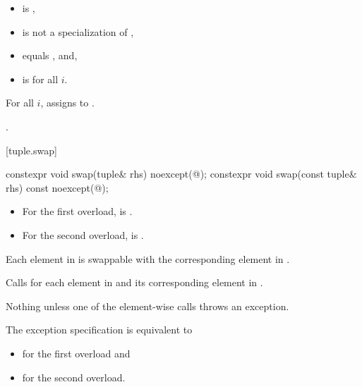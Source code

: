\begin{itemdescr}
\pnum
\constraints
\begin{itemize}
\item
{}
is ,

\item
{}
is not a specialization of ,

\item
{}
equals , and,

\item
{}
is  for all $i$.
\end{itemize}

\pnum
\effects
For all $i$, assigns
 to .

\pnum
\returns
{}.
\end{itemdescr}

[tuple.swap]{}

%
\begin{itemdecl}
constexpr void swap(tuple& rhs) noexcept(@\seebelow@);
constexpr void swap(const tuple& rhs) const noexcept(@\seebelow@);
\end{itemdecl}

\begin{itemdescr}
\pnum
\mandates
\begin{itemize}
\item
For the first overload,
 is .
\item
For the second overload,
 is .
\end{itemize}

\pnum
\expects
Each element in  is swappable with
the corresponding element in .

\pnum
\effects
Calls  for each element in  and its
corresponding element in .

\pnum
\throws
Nothing unless one of the element-wise  calls throws an exception.

\pnum
\remarks
The exception specification is equivalent to
\begin{itemize}
\item
{} for the first overload and
\item
{} for the second overload.
\end{itemize}
\end{itemdescr}

